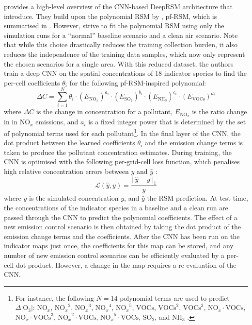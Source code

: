 \noindent {} provides a high-level overview of the CNN-based DeepRSM architecture that \citeauthor{deep-rsm-2020} introduce. They build upon the polynomial RSM by \textcite{pf-rsm-2018}, pf-RSM, which is summarised in . However, \citeauthor{deep-rsm-2020} strive to fit the polynomial RSM using only the simulation runs for a ``normal'' baseline scenario and a clean air scenario. Note that while this choice drastically reduces the training collection burden, it also reduces the independence of the training data samples, which now only represent the chosen scenarios for a single area. With this reduced dataset, the authors train a deep CNN on the spatial concentrations of 18 indicator species to find the per-cell coefficients $\theta_i$ for the following pf-RSM-inspired polynomial:
\begin{equation*}
    \Delta C = \sum_{i=1}^{N} \theta_i \cdot (E_{\text{NO}_{x}})^{a_i} \cdot (E_{\text{SO}_2})^{b_i} \cdot (E_{\text{NH}_3})^{c_i} \cdot (E_{\text{VOCs}})^{d_i}
\end{equation*}
where $\Delta C$ is the change in concentration for a pollutant, $E_{\text{NO}_{x}}$ is the ratio change in in $\text{NO}_{x}$ emissions, and $a_i$ is a fixed integer power that is determined by the set of polynomial terms used for each pollutant\footnote{For instance, the following $N = 14$ polynomial terms are used to predict $\Delta |\text{O}_3|$: $\text{NO}_{x}$, ${\text{NO}_{x}}^2$, ${\text{NO}_{x}}^3$, ${\text{NO}_{x}}^4$, ${\text{NO}_{x}}^5$, $\text{VOCs}$, $\text{VOCs}^2$, $\text{VOCs}^3$, $\text{NO}_{x} \cdot \text{VOCs}$, $\text{NO}_{x} \cdot \text{VOCs}^3$, ${\text{NO}_{x}}^2 \cdot \text{VOCs}$, ${\text{NO}_{x}}^5 \cdot \text{VOCs}$, $\text{SO}_2$, and $\text{NH}_3$ \cite{deep-rsm-2020}.}. In the final layer of the CNN, the dot product between the learned coefficients $\theta_i$ and the emission change terms is taken to produce the pollutant concentration estimates. During training, the CNN is optimised with the following per-grid-cell loss function, which penalises high relative concentration errors between $y$ and $\hat{y}$ \cite{deep-rsm-2020}:
\begin{equation*}
    \mathcal{L}(\hat{y}, y) = \frac{||\hat{y} - y||_1}{y}
\end{equation*}
where $y$ is the simulated concentration $y$, and $\hat{y}$ the RSM prediction. At test time, the concentrations of the indicator species in a baseline and a clean run are passed through the CNN to predict the polynomial coefficients. The effect of a new emission control scenario is then obtained by taking the dot product of the emission change terms and the coefficients. After the CNN has been run on the indicator maps just once, the coefficients for this map can be stored, and any number of new emission control scenarios can be efficiently evaluated by a per-cell dot product. However, a change in the map requires a re-evaluation of the CNN.

